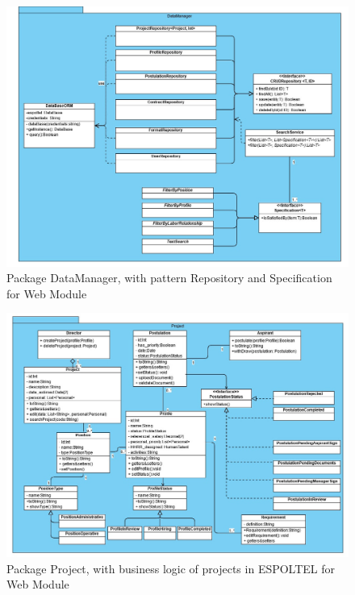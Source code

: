 \documentclass{scrreprt}
\begin{document}
\begin{figure}[H]
	\centering  \small
	\includegraphics[width=\textwidth]{DC/DC4.jpg} 
	\caption{Package DataManager, with pattern Repository and Specification for Web Module}
	\label{fig:Clase4}
\end{figure}

\begin{figure}[H]
	\centering  \small
	\includegraphics[width=\textwidth]{DC/DC5.jpg} 
	\caption{Package Project, with business logic of projects in ESPOLTEL for Web Module}
	\label{fig:Clase5}
\end{figure}
\end{document}
